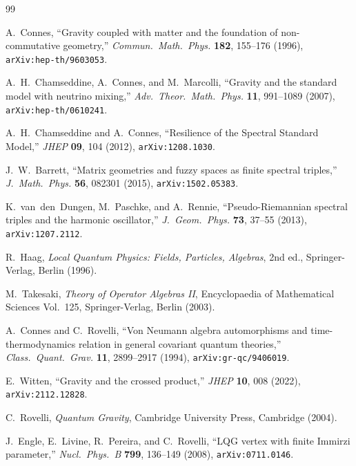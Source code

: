 \documentclass[11pt,a4paper]{article}
\theoremstyle{plain}
\theoremstyle{definition}
\theoremstyle{remark}
\begin{document}
\begin{thebibliography}{99}

A.~Connes, ``Gravity coupled with matter and the foundation of non-commutative geometry,'' \emph{Commun.\ Math.\ Phys.} \textbf{182}, 155--176 (1996), \texttt{arXiv:hep-th/9603053}.

A.~H.~Chamseddine, A.~Connes, and M.~Marcolli, ``Gravity and the standard model with neutrino mixing,'' \emph{Adv.\ Theor.\ Math.\ Phys.} \textbf{11}, 991--1089 (2007), \texttt{arXiv:hep-th/0610241}.

A.~H.~Chamseddine and A.~Connes, ``Resilience of the Spectral Standard Model,'' \emph{JHEP} \textbf{09}, 104 (2012), \texttt{arXiv:1208.1030}.

J.~W.~Barrett, ``Matrix geometries and fuzzy spaces as finite spectral triples,'' \emph{J.\ Math.\ Phys.} \textbf{56}, 082301 (2015), \texttt{arXiv:1502.05383}.

K.~van~den~Dungen, M.~Paschke, and A.~Rennie, ``Pseudo-Riemannian spectral triples and the harmonic oscillator,'' \emph{J.\ Geom.\ Phys.} \textbf{73}, 37--55 (2013), \texttt{arXiv:1207.2112}.

R.~Haag, \emph{Local Quantum Physics: Fields, Particles, Algebras}, 2nd ed., Springer-Verlag, Berlin (1996).

M.~Takesaki, \emph{Theory of Operator Algebras II}, Encyclopaedia of Mathematical Sciences Vol.~125, Springer-Verlag, Berlin (2003).

A.~Connes and C.~Rovelli, ``Von Neumann algebra automorphisms and time-thermodynamics relation in general covariant quantum theories,'' \emph{Class.\ Quant.\ Grav.} \textbf{11}, 2899--2917 (1994), \texttt{arXiv:gr-qc/9406019}.

E.~Witten, ``Gravity and the crossed product,'' \emph{JHEP} \textbf{10}, 008 (2022), \texttt{arXiv:2112.12828}.

C.~Rovelli, \emph{Quantum Gravity}, Cambridge University Press, Cambridge (2004).

J.~Engle, E.~Livine, R.~Pereira, and C.~Rovelli, ``LQG vertex with finite Immirzi parameter,'' \emph{Nucl.\ Phys.\ B} \textbf{799}, 136--149 (2008), \texttt{arXiv:0711.0146}.


\end{thebibliography}
\end{document}

